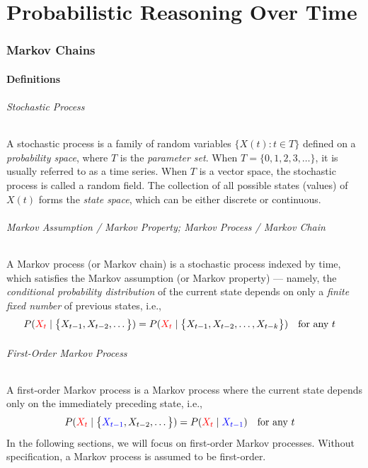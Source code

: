\documentclass[10pt,UTF8]{article}
\theoremstyle{definition}
\newtheorem{definition inner}{Definition}[section]
\theoremstyle{definition}
\newtheorem{theorem inner}{Theorem}[section]
\theoremstyle{definition}
\newtheorem*{proof inner}{\textit{Proof}}
\theoremstyle{plain}
\newtheorem{tip inner}{Tip}[section]
\theoremstyle{remark}
\begin{document}
\part*{Probabilistic Reasoning Over Time}

\section{Markov Chains}

\subsection{Definitions}

\paragraph*{Stochastic Process}
A stochastic process is a family of random variables
\( \big \{ X(t) \colon t \in T \big \} \)
defined on a \emph{probability space},
where \(T\) is the \emph{parameter set}.
When \( T = \big \{ 0, 1, 2, 3, \ldots \big \} \),
it is usually referred to as a time series.
When \(T\) is a vector space, the stochastic process is called a random field.
The collection of all possible states (values) of \(X(t)\) forms the
\emph{state space}, which can be either discrete or continuous.

\paragraph*{Markov Assumption / Markov Property; Markov Process / Markov Chain}
A Markov process (or Markov chain) is a stochastic process indexed by time,
which satisfies the Markov assumption (or Markov property)
--- namely, the \emph{conditional probability distribution}
of the current state depends on only a
\emph{finite fixed number} of previous states, i.e.,
\begin{equation*}
  P(\textcolor{red}{X_t} \mid \big \{
  X_{t-1}, X_{t-2}, \ldots \big \} )
  = P(\textcolor{red}{X_t} \mid \big \{
  X_{t-1}, X_{t-2}, \ldots, X_{t-k} \big \} )
  \qq{for any \(t\)}
\end{equation*}

\paragraph*{First-Order Markov Process}
A first-order Markov process is a Markov process where
the current state depends only on the immediately preceding state, i.e.,
\begin{equation*}
  P(\textcolor{red}{X_t} \mid \big \{
  \textcolor{blue}{X_{t-1}}, X_{t-2}, \ldots \big \} )
  = P(\textcolor{red}{X_t} \mid \textcolor{blue}{X_{t-1}})
  \qq{for any \(t\)}
\end{equation*}
In the following sections, we will focus on first-order Markov processes.
Without specification, a Markov process is assumed to be first-order.
\end{document}
